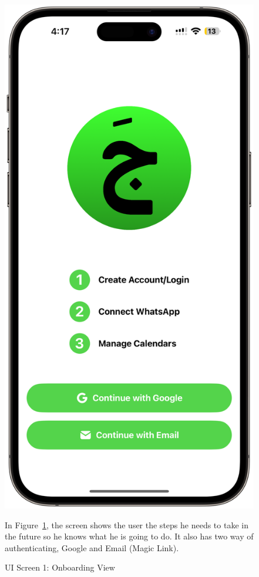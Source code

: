 \begin{figure}[!h]
    \begin{minipage}{0.3\textwidth}
        \centering
        \includegraphics[width=\textwidth]{images/screen1.png}
        \caption{UI Screen 1: Onboarding View}
        \label{fig:ui-screen-1}
    \end{minipage}
    \hfill
    \begin{minipage}{0.65\textwidth}
        In Figure~\ref{fig:ui-screen-1}, the screen shows the user the steps he needs to take in the future so he knows what he is going to do. It also has two way of authenticating, Google and Email (Magic Link).
    \end{minipage}
\end{figure}

